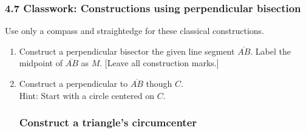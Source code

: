 \documentclass[12pt, oneside]{article}
\begin{document}
\subsubsection*{4.7 Classwork: Constructions using perpendicular bisection}
Use only a compass and straightedge for these classical constructions.
  \begin{enumerate}

  \item Construct a perpendicular bisector the given line segment $\overline{AB}$. Label the midpoint of $\overline{AB}$ as $M$.  [Leave all construction marks.]\\
    \vspace{1cm}
    \begin{center}
    \end{center}
    \vspace{3cm}

  \item Construct a perpendicular to $\overline{AB}$ though $C$.\\
  Hint: Start with a circle centered on $C$.
    \vspace{4cm}
    \begin{center}
  \end{center} %

\newpage
\subsubsection*{Construct a triangle's circumcenter}


\end{enumerate}
\end{document}

